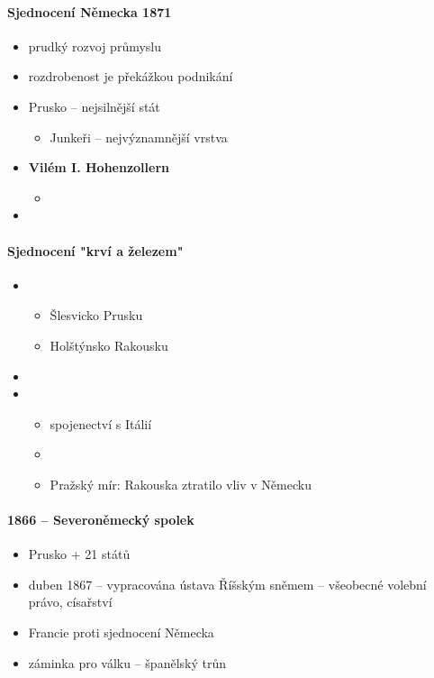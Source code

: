 \paragraph{Sjednocení Německa 1871}
\begin{itemize}
\item prudký rozvoj průmyslu
\item rozdrobenost je překážkou podnikání
\item Prusko -- nejsilnější stát
	\begin{itemize}
	\item Junkeři -- nejvýznamnější vrstva
	\end{itemize}
\item \textbf{Vilém I. Hohenzollern}
	\begin{itemize}
	\item 
	\end{itemize}
\item {}
\end{itemize}

\paragraph{Sjednocení "krví a železem"}
\begin{itemize}
\item {}
	\begin{itemize}
	\item Šlesvicko Prusku
	\item Holštýnsko Rakousku
	\end{itemize}
\item {}
\item {}
	\begin{itemize}
	\item spojenectví s Itálií
	\item {}
	\item Pražský mír: Rakouska ztratilo vliv v Německu
	\end{itemize}
\end{itemize}

\paragraph{1866 -- Severoněmecký spolek}
\begin{itemize}
\item Prusko + 21 států
\item duben 1867 -- vypracována ústava Říšským sněmem -- všeobecné volební právo, císařství
\item Francie proti sjednocení Německa
\item záminka pro válku -- španělský trůn
\end{itemize}

